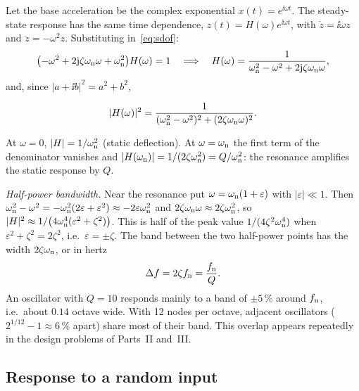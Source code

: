 Let the base acceleration be the complex exponential $x(t) = e^{\ii\omega t}$. The steady-state
response has the same time dependence, $z(t) = H(\omega)e^{\ii\omega t}$, with $\dot z = \ii\omega z$
and $\ddot z = -\omega^2 z$. Substituting in~\eqref{eq:sdof}:
\begin{equation}
  \bigl(-\omega^2 + 2\mathrm{j}\zeta\omega_{\mathrm{n}}\omega + \omega_{\mathrm{n}}^2\bigr)H(\omega) = 1
  \quad\Longrightarrow\quad
  H(\omega) = \frac{1}{\omega_{\mathrm{n}}^2-\omega^2 + 2\mathrm{j}\zeta\omega_{\mathrm{n}}\omega},
\end{equation}
and, since $|a+\ii b|^2 = a^2+b^2$,
\begin{result}
\begin{equation}\label{eq:H2}
  |H(\omega)|^2 = \frac{1}{(\omega_{\mathrm{n}}^2-\omega^2)^2 + (2\zeta\omega_{\mathrm{n}}\omega)^2}.
\end{equation}
\end{result}
At $\omega=0$, $|H|=1/\omega_{\mathrm{n}}^2$ (static deflection). At $\omega = \omega_{\mathrm{n}}$ the first term of the
denominator vanishes and $|H(\omega_{\mathrm{n}})| = 1/(2\zeta\omega_{\mathrm{n}}^2) = Q/\omega_{\mathrm{n}}^2$: the resonance amplifies the static
response by $Q$.

\emph{Half-power bandwidth.} Near the resonance put $\omega = \omega_{\mathrm{n}}(1+\varepsilon)$ with
$|\varepsilon|\ll1$. Then $\omega_{\mathrm{n}}^2-\omega^2 = -\omega_{\mathrm{n}}^2(2\varepsilon+\varepsilon^2) \approx -2\varepsilon\omega_{\mathrm{n}}^2$
and $2\zeta\omega_{\mathrm{n}}\omega\approx 2\zeta\omega_{\mathrm{n}}^2$, so $|H|^2 \approx 1/\bigl(4\omega_{\mathrm{n}}^4(\varepsilon^2+\zeta^2)\bigr)$.
This is half of the peak value $1/(4\zeta^2\omega_{\mathrm{n}}^4)$ when $\varepsilon^2+\zeta^2 = 2\zeta^2$, i.e.\
$\varepsilon = \pm\zeta$. The band between the two half-power points has the width
$2\zeta\omega_{\mathrm{n}}$, or in hertz
\begin{equation}\label{eq:bandwidth}
  \Delta f = 2\zeta f_{\mathrm{n}} = \frac{f_{\mathrm{n}}}{Q}.
\end{equation}
An oscillator with $Q=10$ responds mainly to a band of $\pm5\,\%$ around $f_{\mathrm{n}}$, i.e.\ about $0.14$
octave wide. With 12 nodes per octave, adjacent oscillators ($2^{1/12}-1\approx6\,\%$ apart) share most
of their band. This overlap appears repeatedly in the design problems of Parts~II and~III.

\subsection{Response to a random input}\label{sec:respvar}

